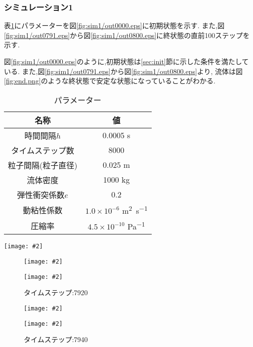 \documentclass[uplatex,a4j,11pt]{jsarticle}
\makeatletter
\def\fgcaption{\def\@captype{figure}\caption}
\newcommand{\mfig}[3][width=15cm]{
\begin{center}
    \texttt{[image: \#2]}
\fgcaption{#3 \label{fig:#2}}
\end{center}
}
\makeatother
\begin{document}
\subsubsection{シミュレーション1}
\label{sec:sim1}
表\ref{tab:sim1}にパラメーターを図\ref{fig:sim1/out0000.eps}に初期状態を示す.
また,図\ref{fig:sim1/out0791.eps}から図\ref{fig:sim1/out0800.eps}に終状態の直前100ステップを示す.

図\ref{fig:sim1/out0000.eps}のように,初期状態は\ref{sec:init}節に示した条件を満たしている.
また,図\ref{fig:sim1/out0791.eps}から図\ref{fig:sim1/out0800.eps}より,
流体は図\ref{fig:end.png}のような終状態で安定な状態になっていることがわかる.
\begin{table}[h]
   \caption{パラメーター}
   \label{tab:sim1}
   \centering
   \begin{tabular}{cc}
     \hline
     名称&値\\
     \hline \hline
     時間間隔$h$&0.0005 \si{\second}\\
     タイムステップ数&8000\\
     粒子間隔(粒子直径)&0.025 \si{\metre}\\
     流体密度&1000 \si{\kilo\gram}\\
     弾性衝突係数$e$&0.2\\
     動粘性係数&$1.0\times10^{-6}$ \si{\metre^{2}.\second^{-1}}\\
     圧縮率&$4.5\times10^{-10}$ \si{\pascal^{-1}}\\
     \hline
   \end{tabular}
\end{table}
\mfig[width=10cm]{sim1/out0000.eps}{初期状態}
\begin{figure}[htbp]
    \begin{minipage}{0.5\hsize}
        \mfig[width=7cm]{sim1/out0791.eps}{タイムステップ:7910}
    \end{minipage}
    \begin{minipage}{0.5\hsize}
        \mfig[width=7cm]{sim1/out0792.eps}{タイムステップ:7920}
    \end{minipage} 
\end{figure}
\begin{figure}[htbp]
    \begin{minipage}{0.5\hsize}
        \mfig[width=7cm]{sim1/out0793.eps}{タイムステップ:7930}
    \end{minipage}
    \begin{minipage}{0.5\hsize}
        \mfig[width=7cm]{sim1/out0794.eps}{タイムステップ:7940}
    \end{minipage} 
\end{figure}
\end{document}
